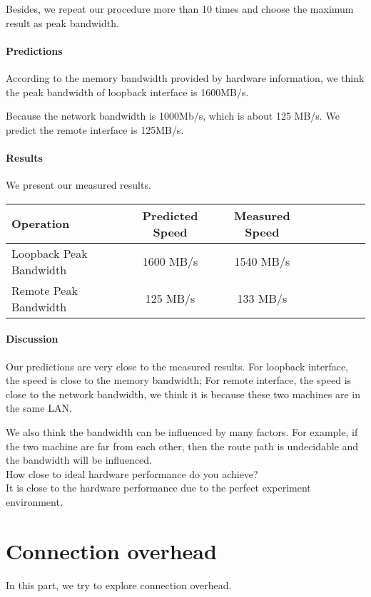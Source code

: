 Besides, we repeat our procedure more than 10 times and choose the maximum result as peak bandwidth.

\paragraph{Predictions}
According to the memory bandwidth provided by hardware information, we think the peak bandwidth of loopback interface is 1600MB/s. 

Because the network bandwidth is 1000Mb/s, which is about 125 MB/s. We predict the remote interface is 125MB/s.

\paragraph{Results}
We present our measured results.

\begin{center}
\begin{tabular}{l*{6}{c}r}
Operation       &  Predicted Speed& Measured Speed\\
\hline
Loopback Peak Bandwidth & 1600 MB/s & 1540 MB/s \\
Remote Peak Bandwidth & 125 MB/s  & 133 MB/s\\
\end{tabular}
\end{center}


\paragraph{Discussion}
Our predictions are very close to the measured results. For loopback interface, the speed is close to the memory bandwidth; For remote interface, the speed is close to the network bandwidth, we think it is because these two machines are in the same LAN.

We also think the bandwidth can be influenced by many factors. For example, if the two machine are far from each other, then the route path is undecidable and the bandwidth will be influenced. \\

How close to ideal hardware performance do you achieve? \\ 
It is close to the hardware performance due to the perfect experiment environment.

\section{Connection overhead}
In this part, we try to explore connection overhead.

